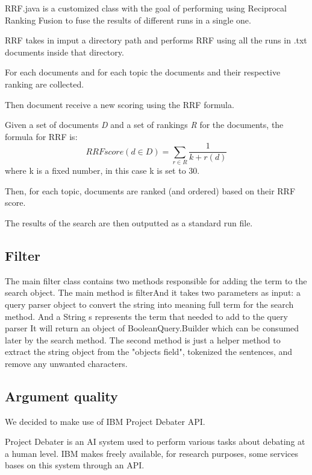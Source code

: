         RRF.java is a customized class with the goal of performing using Reciprocal Ranking Fusion to fuse the results of different runs in a single one.
        
        RRF takes in imput a directory path and performs RRF using all the runs in .txt documents inside that directory.
        
        For each documents and for each topic the documents and their respective ranking are collected.
        
        Then document receive a new scoring using the RRF formula.
        
        Given a set of documents \textit{D} and a set of rankings \textit{R} for the documents, the formula for RRF is:
        $$RRFscore(d \in D)=\sum_{r \in R}^{}\frac{1}{k+r(d)}$$
        where k is a fixed number, in this case k is set to 30.
        
        Then, for each topic, documents are ranked (and ordered) based on their RRF score.
        
        The results of the search are then outputted as a standard run file.
\subsection{Filter}
 
    The main filter class contains two methods responsible for adding the term to the search object. The main method is filterAnd it takes two parameters as input: a query parser object to convert the string into meaning full term for the search method. And a String s represents the term that needed to add to the query parser It will return an object of BooleanQuery.Builder which can be consumed later by the search method. The second method is just a helper method to extract the string object from the "objects field", tokenized the sentences, and remove any unwanted characters.

\subsection{Argument quality}
  \label{subsec:Argument quality}
  We decided to make use of IBM Project Debater API.
  
      Project Debater is an AI system used to perform various tasks about debating at a human level. IBM makes freely available, for research purposes, some services bases on this system through an API. \citep{ProjectDebaterAPI}
      
